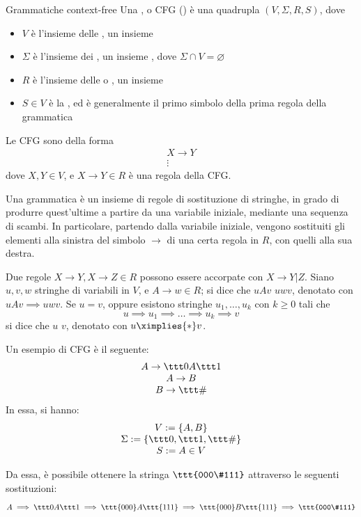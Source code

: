 \documentclass[a4paper, 12pt]{report}
\begin{document}
    \begin{frameddefn}[breakable]{Grammatiche context-free}
        Una , o CFG () è una quadrupla $(V, \Sigma, R, S)$, dove

        \begin{itemize}
            \item $V$ è l'insieme delle , un insieme 
            \item $\Sigma$ è l'insieme dei , un insieme , dove $\Sigma \cap V = \varnothing$
            \item $R$ è l'insieme delle  o , un insieme 
            \item $S \in V$ è la , ed è generalmente il primo simbolo della prima regola della grammatica
        \end{itemize}

        Le CFG sono della forma $$\left . \begin{array}{c} X \to Y \\ \vdots \end{array} \right .$$ dove $X, Y \in V$, e $X \to Y \in R$ è una regola della CFG.

        Una grammatica è un insieme di regole di sostituzione di stringhe, in grado di produrre quest'ultime a partire da una variabile iniziale, mediante una sequenza di scambi. In particolare, partendo dalla variabile iniziale, vengono sostituiti gli elementi alla sinistra del simbolo $\to$ di una certa regola in $R$, con quelli alla sua destra.

        Due regole $X \to Y, X \to Z \in R$ possono essere accorpate con $X \to Y | Z$. Siano $u, v, w$ stringhe di variabili in $V$, e $A \to w \in R$; si dice che $uAv$  $uwv$, denotato con $uAv \implies uwv$. Se $u = v$, oppure esistono stringhe $u_1, \ldots, u_k$ con $k \ge 0$ tali che $$u \implies u_1 \implies \ldots \implies u_k \implies v$$ si dice che $u$  $v$, denotato con $u \ximplies{*} v$.
    \end{frameddefn}

    \begin{example}[CFG]
        \label{cfg ex}
        Un esempio di CFG è il seguente: $$\left . \begin{array}{c} A \to \ttt 0 A \ttt 1 \\ A \to B \\ B \to \ttt \# \end{array} \right .$$ In essa, si hanno: $$\left . \begin{array}{c} V := \{A, B\} \\ \Sigma := \{\ttt 0, \ttt 1, \ttt \# \} \\ S := A \in V \end{array} \right. $$

        Da essa, è possibile ottenere la stringa $\ttt{000\#111}$ attraverso le seguenti sostituzioni: $$A \implies \ttt 0 A \ttt 1 \implies \ttt{000}A\ttt{111} \implies \ttt{000}B\ttt{111} \implies \ttt{000\#111}$$
    \end{example}
\end{document}
